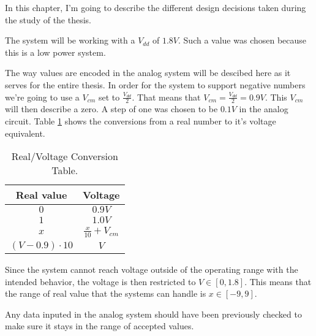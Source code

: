 
\label{cap:design}

In this chapter, I'm going to describe the different design decisions taken during the study of the thesis.

The system will be working with a $V_{dd}$ of $1.8V$. Such a value was chosen because this is a low power system.

The way values are encoded in the analog system will be descibed here as it serves for the entire thesis.
In order for the system to support negative numbers we're going to use a $V_{cm}$ set to $\frac{V_{dd}}{2}$. That means that $V_{cm}=\frac{V_{dd}}{2}=0.9V$. This $V_{cm}$ will then describe a zero. A step of one was chosen to be $0.1V$ in the analog circuit.
Table \ref{tab:valConv} shows the conversions from a real number to it's voltage equivalent.

\begin{table}[H]
  \centering
  \begin{tabular}{|c|c|}
    \hline
    \rowcolor{gray}
    Real value & Voltage \\
    \hline
    $0$ & $0.9V$ \\
    \hline
    $1$ & $1.0V$ \\
    \hline
    $x$ & $\frac{x}{10}+V_{cm}$\\
    \hline
    $(V-0.9)\cdot 10$ & $V$\\
    \hline
  \end{tabular}
  \caption{Real/Voltage Conversion Table.}
  \label{tab:valConv}
\end{table}

Since the system cannot reach voltage outside of the operating range with the intended behavior, the voltage is then restricted to $V\in [0,1.8]$. This means that the range of real value that the systems can handle is $x\in [-9,9]$.

Any data inputed in the analog system should have been previously checked to make sure it stays in the range of accepted values.






\cleardoublepage
